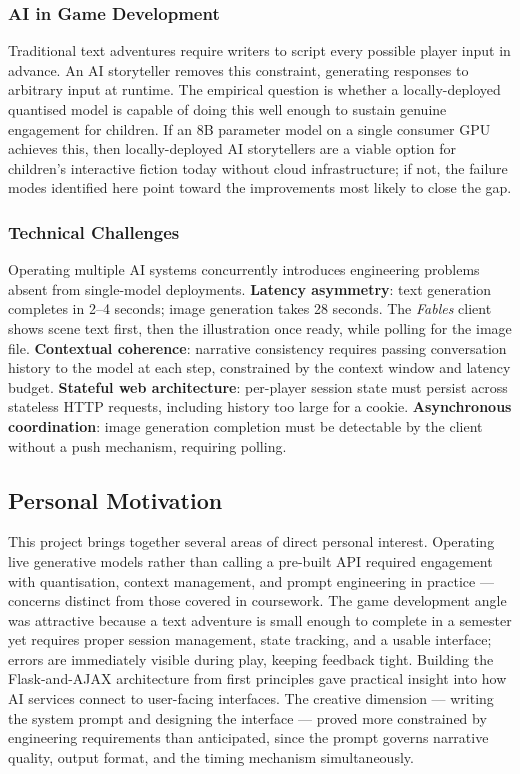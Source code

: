 \documentclass[12pt,a4paper]{article}
\begin{document}
\subsubsection{AI in Game Development}

Traditional text adventures require writers to script every possible player input in advance. An AI storyteller removes this constraint, generating responses to arbitrary input at runtime. The empirical question is whether a locally-deployed quantised model is capable of doing this well enough to sustain genuine engagement for children. If an 8B parameter model on a single consumer GPU achieves this, then locally-deployed AI storytellers are a viable option for children's interactive fiction today without cloud infrastructure; if not, the failure modes identified here point toward the improvements most likely to close the gap.

\subsubsection{Technical Challenges}

Operating multiple AI systems concurrently introduces engineering problems absent from single-model deployments. \textbf{Latency asymmetry}: text generation completes in 2--4 seconds; image generation takes 28 seconds. The \textit{Fables} client shows scene text first, then the illustration once ready, while polling for the image file. \textbf{Contextual coherence}: narrative consistency requires passing conversation history to the model at each step, constrained by the context window and latency budget. \textbf{Stateful web architecture}: per-player session state must persist across stateless HTTP requests, including history too large for a cookie. \textbf{Asynchronous coordination}: image generation completion must be detectable by the client without a push mechanism, requiring polling.

    \subsection{Personal Motivation}

This project brings together several areas of direct personal interest. Operating live generative models rather than calling a pre-built API required engagement with quantisation, context management, and prompt engineering in practice --- concerns distinct from those covered in coursework. The game development angle was attractive because a text adventure is small enough to complete in a semester yet requires proper session management, state tracking, and a usable interface; errors are immediately visible during play, keeping feedback tight. Building the Flask-and-AJAX architecture from first principles gave practical insight into how AI services connect to user-facing interfaces. The creative dimension --- writing the system prompt and designing the interface --- proved more constrained by engineering requirements than anticipated, since the prompt governs narrative quality, output format, and the timing mechanism simultaneously.
\end{document}
